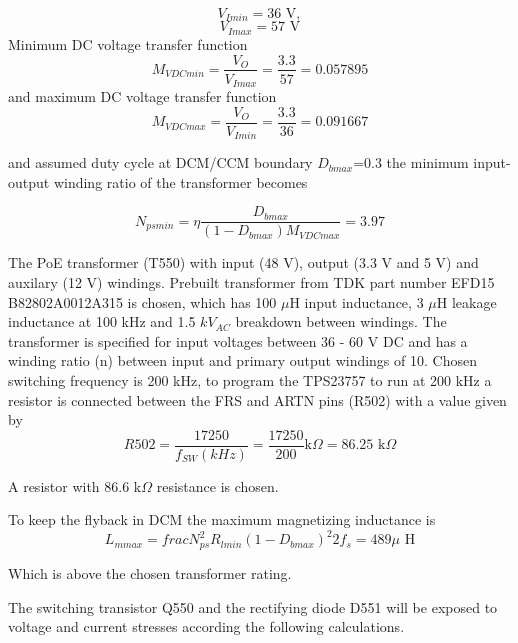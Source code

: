 \begin{equation}
V_{Imin}=36 \text{ V},
\end{equation}
\begin{equation}
V_{Imax}=57 \text{ V}
\end{equation}
Minimum DC voltage transfer function
\begin{equation}
M_{V DCmin}=\frac{V_O}{V_{Imax}}=\frac{3.3}{57}=0.057895
\end{equation}
and maximum DC voltage transfer function
\begin{equation}
M_{V DCmax}=\frac{V_O}{V_{Imin}}=\frac{3.3}{36}=0.091667
\end{equation}

and assumed duty cycle at DCM/CCM boundary $D_{b max}$=0.3 the minimum
input-output winding ratio of the transformer becomes

\begin{equation}
N_{ps min}=\eta \frac{D_{b max}}{(1-D_{b max})M_{V DCmax}}=3.97
\end{equation}

The PoE transformer (T550) with input (48 V), output (3.3 V and 5 V)
and auxilary (12 V) windings. Prebuilt transformer from TDK part
number EFD15 B82802A0012A315 is chosen, which has 100 $\mu$H input
inductance, 3 $\mu$H leakage inductance at 100 kHz and 1.5 $kV_{AC}$
breakdown between windings. The transformer is specified for input
voltages between 36 - 60 V DC and has a winding ratio (n) between
input and primary output windings of 10. Chosen switching frequency is
200 kHz, to program the TPS23757 to run at 200 kHz a resistor is
connected between the FRS and ARTN pins (R502) with a value given by
\begin{equation}
R502 = \frac{17250}{f_{SW} (kHz)} = \frac{17250}{200} \text{
k$\Omega$} = 86.25 \text{ k$\Omega$}
\end{equation}

A resistor with 86.6 k$\Omega$ resistance is chosen.

To keep the flyback in DCM the maximum magnetizing inductance is
\begin{equation}
L_{m max}=frac{N_{ps}^2 R_{l min} (1-D_{b max})^2}{2
f_{s}}=489 \text{$\mu$ H}
\end{equation}

Which is above the chosen transformer rating.

The switching transistor Q550 and the rectifying diode D551 will be
exposed to voltage and current stresses according the following
calculations.


